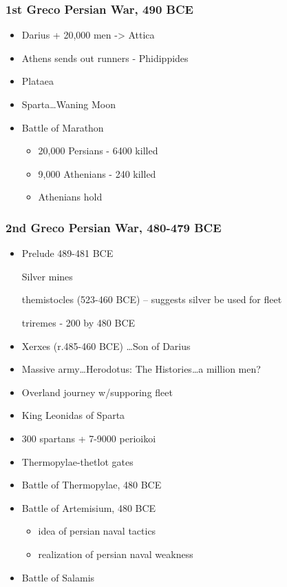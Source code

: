 \documentclass[11pt, a4paper]{article}
\begin{document}
\subsubsection{1st Greco Persian War, 490 BCE}
\begin{itemize}
  \item Darius + 20,000 men -> Attica
  \item Athens sends out runners - Phidippides
  \item Plataea
  \item Sparta\dots Waning Moon
  \item Battle of Marathon
    \begin{itemize}
      \item 20,000 Persians - 6400 killed
      \item 9,000 Athenians - 240 killed
      \item Athenians hold
    \end{itemize}
\end{itemize}
\subsubsection{2nd Greco Persian War, 480-479 BCE}
\begin{itemize}
  \item Prelude 489-481 BCE
    
    Silver mines

    themistocles (523-460 BCE) -- suggests silver be used for fleet

    triremes - 200 by 480 BCE

  \item Xerxes (r.485-460 BCE) \dots Son of Darius
  \item Massive army\dots Herodotus: The Histories\dots a million men?
  \item Overland journey w/supporing fleet
  \item King Leonidas of Sparta
  \item 300 spartans + 7-9000 perioikoi
  \item Thermopylae-thetlot gates
  \item Battle of Thermopylae, 480 BCE
  \item Battle of Artemisium, 480 BCE
    \begin{itemize}
      \item idea of persian naval tactics
      \item realization of persian naval weakness
    \end{itemize}
  \item Battle of Salamis
\end{itemize}
\end{document}
